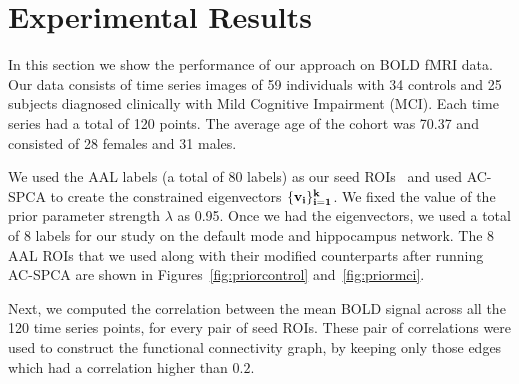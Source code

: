 \documentclass{article}
\begin{document}

\section{Experimental Results}
In this section we show the performance of our approach on BOLD fMRI data. Our data consists of time series images of 59 individuals with 34 controls and 25 subjects diagnosed clinically with Mild Cognitive Impairment (MCI).  Each time series had a total of 120 points. The average age of the cohort was 70.37 and consisted of 28 females and 31 males.

We used the AAL labels (a total of 80 labels) as our seed ROIs~\citep{tzourio2002automated} and used AC-SPCA to create the constrained eigenvectors $\{\bf v_i\}_{i=1}^k$. We fixed the value of the prior parameter strength $\lambda$ as 0.95. Once we had the eigenvectors,  we used a total of 8 labels for our study on the default mode and hippocampus network. The 8 AAL ROIs that we used along with their modified counterparts after running AC-SPCA are shown in Figures~\ref{fig:priorcontrol} and~\ref{fig:priormci}.



Next, we computed the correlation between the mean BOLD signal across all the 120 time series points, for every pair of seed ROIs. These pair of correlations were used to construct the functional connectivity graph, by keeping only those edges which had a correlation higher than $0.2$. 
\end{document}
